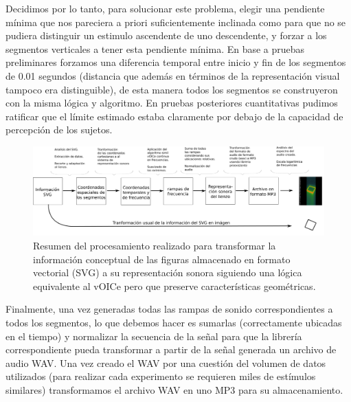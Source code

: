 \documentclass{article}
\begin{document}
    Decidimos por lo tanto, para solucionar este problema, elegir una pendiente mínima que nos pareciera a priori suficientemente inclinada como para que no se pudiera distinguir un estimulo ascendente de uno descendente, y forzar a los segmentos verticales a tener esta pendiente mínima. En base a pruebas preliminares forzamos una diferencia temporal entre inicio y fin de los segmentos de 0.01 segundos (distancia que además en términos de la representación visual tampoco era distinguible), de esta manera todos los segmentos se construyeron con la misma lógica y algoritmo. En pruebas posteriores cuantitativas pudimos ratificar que el límite estimado estaba claramente por debajo de la capacidad de percepción de los sujetos. 
    
    \begin{figure}
        \center
        \includegraphics[width=\textwidth]{Imagenes/diagramaSVG.png}
        \caption{Resumen del procesamiento realizado para transformar la información conceptual de las figuras almacenado en formato vectorial (SVG) a su representación sonora siguiendo una lógica equivalente al vOICe pero que preserve características geométricas.}
        \label{fig:diagramaSVG}
    \end{figure}
    
    Finalmente, una vez generadas todas las rampas de sonido correspondientes a todos los segmentos, lo que debemos hacer es sumarlas (correctamente ubicadas en el tiempo) y normalizar la secuencia de la señal para que la librería correspondiente pueda transformar a partir de la señal generada un archivo de audio WAV. Una vez creado el WAV por una cuestión del volumen de datos utilizados (para realizar cada experimento se requieren miles de estímulos similares) transformamos el archivo WAV en uno MP3 para su almacenamiento. 
\end{document}
